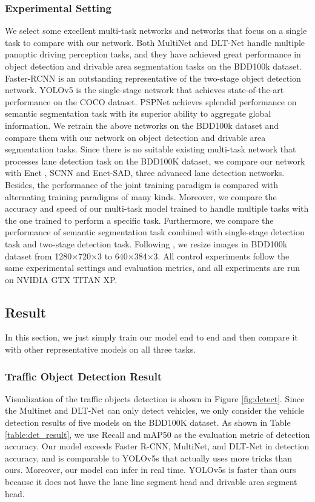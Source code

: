 \documentclass[10pt,twocolumn,letterpaper]{article}
\begin{document}
\subsubsection{Experimental Setting}

We select some excellent multi-task networks and networks that focus on a single task to compare with our network. Both MultiNet and DLT-Net handle multiple panoptic driving perception tasks, and they have achieved great performance in object detection and drivable area segmentation tasks on the BDD100k dataset. Faster-RCNN is an outstanding representative of the two-stage object detection network. YOLOv5 is the single-stage network that achieves state-of-the-art performance on the COCO dataset. PSPNet achieves splendid performance on semantic segmentation task with its superior ability to aggregate global information. We retrain the above networks on the BDD100k dataset and compare them with our network on object detection and drivable area segmentation tasks. Since there is no suitable existing multi-task network that processes lane detection task on the BDD100K dataset, we compare our network with Enet \cite{enet}, SCNN and Enet-SAD, three advanced lane detection networks. Besides, the performance of the joint training paradigm is compared with alternating training paradigms of many kinds. Moreover, we compare the accuracy and speed of our multi-task model trained to handle multiple tasks with the one trained to perform a specific task. Furthermore, we compare the performance of semantic segmentation task combined with single-stage detection task and two-stage detection task. Following \cite{sad-enet}, we resize images in BDD100k dataset from 1280$\times$720$\times$3 to 640$\times$384$\times$3. All control experiments follow the same experimental settings and evaluation metrics, and all experiments are run on NVIDIA GTX TITAN XP.

\subsection{Result}

In this section, we just simply train our model end to end and then compare it with other representative models on all three tasks. 



\subsubsection{Traffic Object Detection Result}
Visualization of the traffic objects detection is shown in Figure \ref{fig:detect}. Since the Multinet and DLT-Net can only detect vehicles, we only consider the vehicle detection results of five models on the BDD100K dataset. As shown in Table \ref{table:det_result}, we use Recall and mAP50 as the evaluation metric of detection accuracy. Our model exceeds Faster R-CNN, MultiNet, and DLT-Net in detection accuracy, and is comparable to YOLOv5s that actually uses more tricks than ours. Moreover, our model can infer in real time. YOLOv5s is faster than ours because it does not have the lane line segment head and drivable area segment head.
\end{document}

